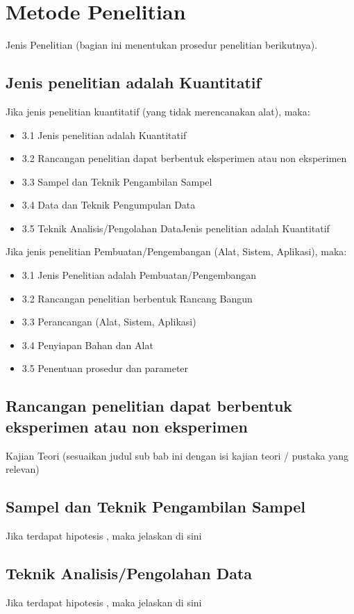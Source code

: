 \chapter{Metode Penelitian}
\label{chap: metode}

Jenis Penelitian (bagian ini menentukan prosedur penelitian berikutnya).

\section{Jenis penelitian adalah Kuantitatif}
\label{chap: kuantitatif}
Jika jenis penelitian kuantitatif (yang tidak merencanakan alat), maka:

\begin{itemize}
    \item 3.1 Jenis penelitian adalah Kuantitatif
    \item 3.2 Rancangan penelitian dapat berbentuk eksperimen atau non eksperimen
    \item 3.3 Sampel dan Teknik Pengambilan Sampel
    \item 3.4 Data dan Teknik Pengumpulan Data
    \item 3.5 Teknik Analisis/Pengolahan DataJenis penelitian adalah Kuantitatif
\end{itemize}

Jika jenis penelitian Pembuatan/Pengembangan (Alat, Sistem, Aplikasi), maka:
\begin{itemize}
    \item 3.1 Jenis Penelitian adalah Pembuatan/Pengembangan
    \item 3.2 Rancangan penelitian berbentuk Rancang Bangun
    \item 3.3 Perancangan (Alat, Sistem, Aplikasi)
    \item 3.4 Penyiapan Bahan dan Alat
    \item 3.5 Penentuan prosedur dan parameter
\end{itemize}

\section{Rancangan penelitian dapat berbentuk eksperimen atau non eksperimen}
\label{sec:rancangan}
Kajian Teori (sesuaikan judul sub bab ini dengan isi kajian teori / pustaka yang relevan)


\section{Sampel dan Teknik Pengambilan Sampel}
\label{sec:sampel}
Jika terdapat hipotesis , maka jelaskan di sini



\section{Teknik Analisis/Pengolahan Data}
\label{sec:olahdata}
Jika terdapat hipotesis , maka jelaskan di sini

